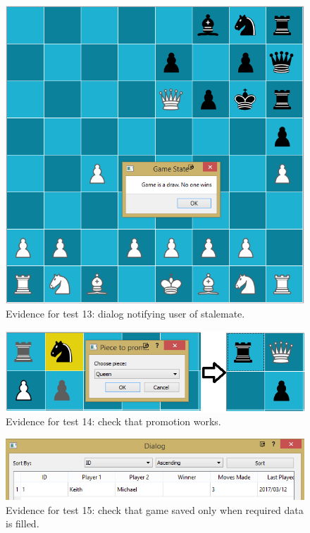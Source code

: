 \begin{figure}[H]
	\centering
	\includegraphics[width=1.0\textwidth]{images/screenshots/test-13}
	\caption{Evidence for test 13: dialog notifying user of stalemate.}
	\label{test-13}
\end{figure}
\begin{figure}[H]
	\centering
	\includegraphics[width=1.0\textwidth]{images/screenshots/test-14}
	\caption{Evidence for test 14: check that promotion works.}
	\label{test-14}
\end{figure}
\begin{figure}[H]
	\centering
	\includegraphics[width=1.0\textwidth]{images/screenshots/test-15}
	\caption{Evidence for test 15: check that game saved only when required data is filled.}
	\label{test-15}
\end{figure}
